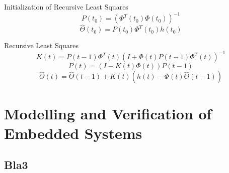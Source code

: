 Initialization of Recursive Least Squares
\begin{equation}
	P(t_0) = \left( \Phi^T(t_0) \Phi(t_0) \right)^{-1}
\end{equation}
\begin{equation}
	\hat \Theta (t_0) = P(t_0) \Phi^T(t_0) h(t_0)
\end{equation}

Recursive Least Squares
\begin{equation}
	K(t) = P(t-1) \Phi^T(t) (I + \Phi(t) P(t - 1) \Phi^T(t))^{-1}
\end{equation}
\begin{equation}
	P(t) = (I - K(t) \Phi(t)) P(t - 1)
\end{equation}
\begin{equation}
	\hat \Theta(t) = \hat \Theta(t - 1) + K(t) (h(t) - \Phi(t) \hat \Theta(t - 1))
\end{equation}

\chapter{Modelling and Verification of Embedded Systems}

\section{Bla3}
\label{sec:bla3}
\lipsum[1] 

